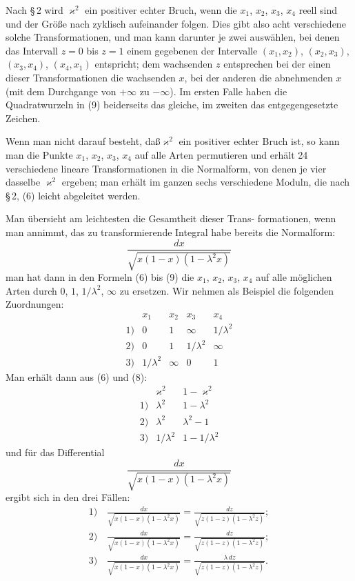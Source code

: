 \documentclass[12pt,a4paper]{book}
\theoremstyle{definition}
\begin{document}
Nach \S\,2 wird $\varkappa^2$ ein positiver echter Bruch, wenn die $x_1$,
$x_2$, $x_3$, $x_4$ reell sind und der Gr\"o\ss e nach zyklisch aufeinander
folgen. Dies gibt also acht verschiedene solche Transformationen,
und man kann darunter je zwei ausw\"ahlen, bei denen das Intervall
$z = 0$ bis $z = 1$ einem gegebenen der Intervalle $(x_1, x_2)$, $(x_2, x_3)$,
$(x_3, x_4)$, $(x_4, x_1)$ entspricht; dem wachsenden $z$ entsprechen bei der
einen dieser Transformationen die wachsenden $x$, bei der anderen
die abnehmenden $x$ (mit dem Durchgange von $+\infty$ zu $-\infty$).
Im ersten Falle haben die Quadratwurzeln in (9) beiderseits das
gleiche, im zweiten das entgegengesetzte Zeichen.

Wenn man nicht darauf besteht, da\ss $\varkappa^2$ ein positiver echter
Bruch ist, so kann man die Punkte $x_1$, $x_2$, $x_3$, $x_4$ auf alle Arten
permutieren und erh\"alt 24 verschiedene lineare Transformationen
in die Normalform, von denen je vier dasselbe $\varkappa^2$ ergeben; man
erh\"alt im ganzen sechs verschiedene Moduln, die nach \S\,2, (6)
leicht abgeleitet werden.

Man \"ubersieht am leichtesten die Gesamtheit dieser Trans-
formationen, wenn man annimmt, das zu transformierende Integral
habe bereits die Normalform:
\[
\frac{dx}{\sqrt{x(1 - x)(1 - \lambda^2 x)}}
\]
man hat dann in den Formeln (6) bis (9) die $x_1$, $x_2$, $x_3$, $x_4$
auf alle m\"oglichen Arten durch $0$, $1$, $1/\lambda^2$, $\infty$ zu ersetzen.
Wir nehmen als Beispiel die folgenden Zuordnungen:
\[
\begin{array}{c|cccc}
& x_1 & x_2 & x_3 & x_4 \\ \hline
1) & 0 & 1 & \infty & 1/\lambda^2 \\
2) & 0 & 1 & 1/\lambda^2 & \infty \\
3) & 1/\lambda^2 & \infty & 0 & 1
\end{array}
\]
Man erh\"alt dann aus (6) und (8):
\[
\begin{array}{c|c|c}
& \varkappa^2 & 1 - \varkappa^2 \\ \hline
1) & \lambda^2 & 1 - \lambda^2 \\
2) & \lambda^2 & \lambda^2 - 1 \\
3) & 1/\lambda^2 & 1 - 1/\lambda^2
\end{array}
\]
und f\"ur das Differential
\[
\frac{dx}{\sqrt{x(1 - x)(1 - \lambda^2 x)}}
\]
ergibt sich in den drei F\"allen:
\[
\begin{array}{c}
1)\quad \displaystyle\frac{dx}{\sqrt{x(1 - x)(1 - \lambda^2 x)}} = \frac{dz}{\sqrt{z(1 - z)(1 - \lambda^2 z)}};\\[1em]
2)\quad \displaystyle\frac{dx}{\sqrt{x(1 - x)(1 - \lambda^2 x)}} = \frac{dz}{\sqrt{z(1 - z)(1 - \lambda^2 z)}};\\[1em]
3)\quad \displaystyle\frac{dx}{\sqrt{x(1 - x)(1 - \lambda^2 x)}} = \frac{\lambda\,dz}{\sqrt{z(1 - z)(1 - \lambda^2 z)}}.
\end{array}
\]
\end{document}
